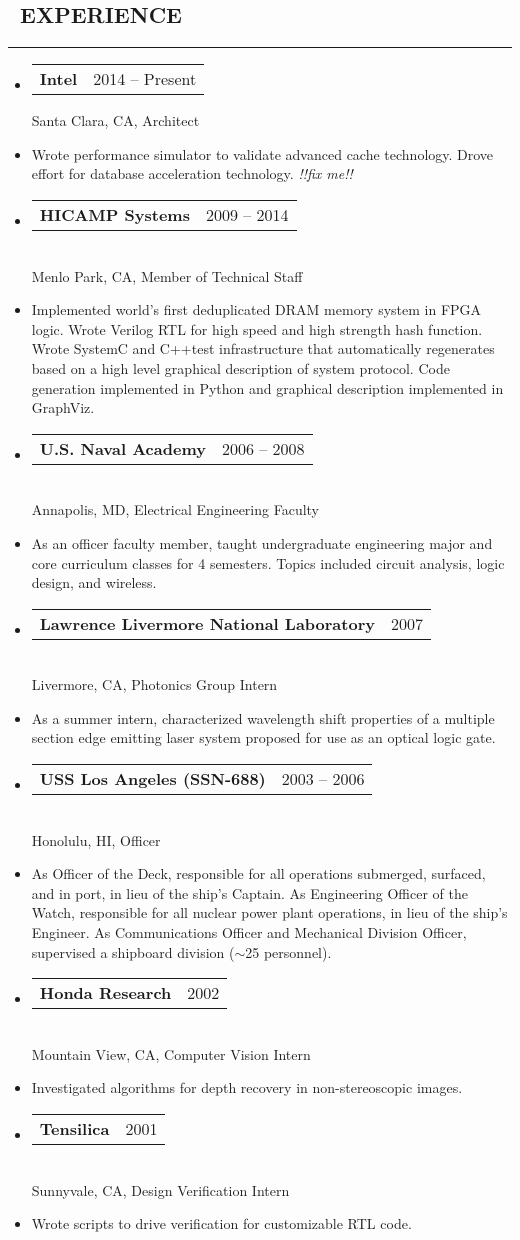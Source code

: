 \documentclass[10pt,letterpaper]{article}
\makeatletter
\newenvironment{resumesection}[1]
{%
    \subsection*{\ \textcolor{light-gray}{#1} }
    \vspace{-0.4em}
    \begin{samepage}
    \hrule
    \end{samepage}
    \vspace{+0.4em}
    \begin{itemize}[leftmargin=0.15cm]
        \parskip=0.1em
}%
{%
    \end{itemize}
}%
\newcommand{\myitem}[1]
{\item[] \textcolor{dark-gray}{#1} }
\newcommand{\headerrowx}[2]
{\item[] \begin{tabular*}{\linewidth}{l@{\extracolsep{\fill}}r}
	#1 &
	#2 \\
\end{tabular*}}
\newcommand{\CPP}
{C++}
\newcommand{\rminiw}{0.550}
\makeatother
\begin{document}
\begin{minipage}[t]{\rminiw\textwidth}
\begin{resumesection}{EXPERIENCE}
    \headerrowx{ \textbf{Intel}}{2014 -- Present}
    
    Santa Clara, CA, Architect
    \myitem{Wrote performance simulator to validate advanced cache technology.
            Drove effort for database acceleration technology.
            \textit{!!fix me!!}}
    
    \headerrowx{ \textbf{HICAMP Systems}}{2009 -- 2014} \\
    Menlo Park, CA, Member of Technical Staff
    \myitem{Implemented world's first deduplicated DRAM memory system in FPGA logic.
            Wrote Verilog RTL for high speed and high strength hash function.
            Wrote SystemC and \CPP  test infrastructure that automatically regenerates based on a high level graphical description of system protocol.
            Code generation implemented in Python and graphical description implemented in GraphViz.}
    
    \headerrowx{ \textbf{U.S. Naval Academy}}{2006 -- 2008} \\
    Annapolis, MD, Electrical Engineering Faculty
    \myitem{As an officer faculty member, taught undergraduate engineering major and core curriculum classes for 4 semesters.
            Topics included circuit analysis, logic design, and wireless.}
    
    \headerrowx{ \textbf{Lawrence Livermore National Laboratory}}{2007} \\
    Livermore, CA, Photonics Group Intern
    \myitem{As a summer intern, characterized wavelength shift properties of a multiple section edge emitting laser system proposed for use as an optical logic gate.}
    
    \headerrowx{ \textbf{USS Los Angeles (SSN-688)}}{2003 -- 2006} \\
    Honolulu, HI, Officer
    \myitem{As Officer of the Deck, responsible for all operations submerged, surfaced, and in port, in lieu of the ship's Captain.
            As Engineering Officer of the Watch, responsible for all nuclear power plant operations, in lieu of the ship's Engineer.
            As Communications Officer and Mechanical Division Officer, supervised a shipboard division ({\footnotesize{$\sim$}}25 personnel).}
    
    \headerrowx{ \textbf{Honda Research}}{2002} \\
    Mountain View, CA, Computer Vision Intern
    \myitem{Investigated algorithms for depth recovery in non-stereoscopic images.}
    
    \headerrowx{ \textbf{Tensilica}}{2001} \\
    Sunnyvale, CA, Design Verification Intern
    \myitem{Wrote scripts to drive verification for customizable RTL code.}
\end{resumesection}

\end{minipage}
\end{document}
